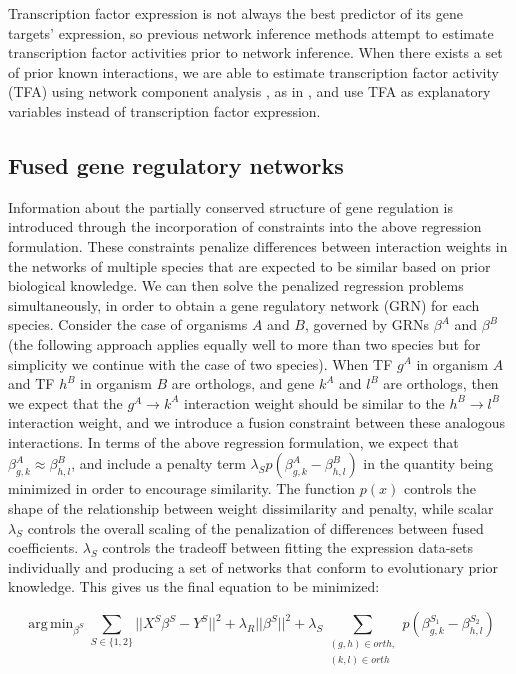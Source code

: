 \documentclass[11pt]{article}
\DeclareMathOperator*{\argmin}{arg\,min}
\begin{document}
Transcription factor expression is not always the best predictor of its gene targets' expression, so  previous network inference methods attempt to estimate transcription factor activities prior to network inference. 
When there exists a set of prior known interactions, we are able to estimate transcription factor activity (TFA) using network component analysis \cite{liao2003network}, as in \cite{arrieta-ortiz_experimentally_2015, fu_reconstructing_2011}, and use TFA as explanatory variables instead of transcription factor expression. 


\subsection{Fused gene regulatory networks}

Information about the partially conserved structure of gene regulation is introduced through the incorporation of constraints into the above regression formulation. These constraints penalize differences between interaction weights in the networks of multiple species that are expected to be similar based on prior biological knowledge. 
We can then solve the penalized regression problems simultaneously, in order to obtain a gene regulatory network (GRN) for each species. 
Consider the case of organisms $A$ and $B$, governed by GRNs $\beta^A$ and $\beta^B$ (the following approach applies equally well to more than two species but for simplicity we continue with the case of two species). 
When TF $g^A$ in organism $A$ and TF $h^B$ in organism $B$ are orthologs, and gene $k^A$ and $l^B$ are orthologs, then we expect that the $g^A \rightarrow k^A$ interaction weight should be similar to the $h^B \rightarrow l^B$ interaction weight, and we introduce a fusion constraint between these analogous interactions. 
In terms of the above regression formulation, we expect that $\beta^A_{g,k} \approx \beta^B_{h,l}$, and include a penalty term $\lambda_Sp(\beta^A_{g,k} - \beta^B_{h,l})$ in the quantity being minimized in order to encourage similarity. 
The function $p(x)$ controls the shape of the relationship between weight dissimilarity and penalty, while scalar $\lambda_S$ controls the overall scaling of the penalization of differences between fused coefficients. $\lambda_S$ controls the tradeoff between fitting the expression data-sets individually and producing a set of networks that conform to evolutionary prior knowledge. 
This gives us the final equation to be minimized: 

\begin{equation}
\argmin_{\beta^S} \displaystyle\sum_{S \in \{1, 2\}} \vert \vert X^S\beta^S - Y^S \vert \vert ^2 + \lambda_R \vert \vert \beta^S \vert \vert ^2 + \lambda_S \displaystyle \sum_{\substack{(g,h) \in orth,\\
 (k,l) \in orth}}p(\beta^{S_1}_{g,k} - \beta^{S_2}_{h,l})
\end{equation}
\end{document}
